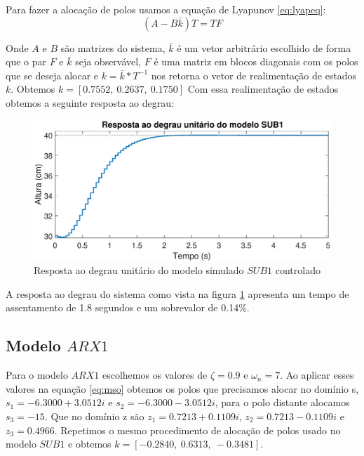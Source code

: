 Para fazer a alocação de polos usamos a equação de Lyapunov
\eqref{eq:lyapeq}:
\begin{equation}\label{eq:lyapeq}
(A-B\bar{k})T=TF
\end{equation}

Onde $A$ e $B$ são matrizes do sistema, $\bar{k}$ é um vetor arbitrário escolhido de forma que o par $F$ e $\bar{k}$ seja observável, $F$ é uma matriz em blocos diagonais com os polos que se deseja alocar e $k=\bar{k}*T^{-1}$ nos retorna o vetor de realimentação de estados $k$. Obtemos $k=[0.7552,~0.2637,~0.1750]$ Com essa realimentação de estados obtemos a seguinte resposta ao degrau:

\begin{figure}[H]
	\centering
	\includegraphics[width=1\linewidth]{respostadegrausub1c}
	\caption[Resposta ao degrau unitário do modelo $SUB1$ controlado]{Resposta ao degrau unitário do modelo simulado $SUB1$ controlado}
	\label{fig:respostadegrausub1c}
\end{figure}


A resposta ao degrau do sistema como vista na figura \ref{fig:respostadegrausub1c} apresenta um tempo de assentamento de 1.8 segundos e um sobrevalor de 0.14\%.

\subsection{Modelo $ARX1$}\label{s:ctrlarx1}

Para o modelo $ARX1$ escolhemos os valores de $\zeta=0.9$ e $\omega_n=7$. Ao aplicar esses valores na equação \eqref{eq:mso} obtemos os polos que precisamos alocar no domínio s, $s_1=-6.3000 + 3.0512i$ e $s_2=-6.3000 - 3.0512i$, para o polo distante alocamos $s_3=-15$. Que no domínio z são $z_1=0.7213 + 0.1109i$, $z_2=0.7213 - 0.1109i$ e $z_3=0.4966$. Repetimos o mesmo procedimento de alocação de polos usado no modelo $SUB1$ e obtemos $k=[-0.2840,~0.6313,~-0.3481]$.


